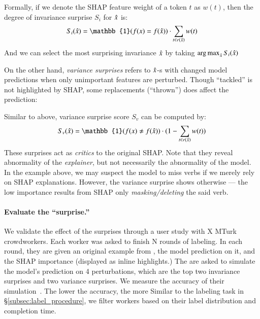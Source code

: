 Formally, if we denote the SHAP feature weight of a token $t$ as $w(t)$, then the degree of invariance surprise $S_i$ for $\hat{x}$ is: 
$$S_i(\xp) = \mathbb{1}(f(x) = f(\xp)) \cdot \sum_{t \in r(\xp)} w(t) $$
And we can select the most surprising invariance $\hat{x}$ by taking $\operatorname*{arg\,max}_{\hat{x}} S_i(\hat{x})$

On the other hand, \emph{variance surprises} refers to $\hat{x}$-s with changed model predictions when only unimportant features are perturbed.
Though ``tackled'' is not highlighted by SHAP, some replacements (\eg ``thrown'') does affect the prediction:


Similar to above, variance surprise score $S_v$ can be computed by:
$$S_v(\xp) = \mathbb{1}(f(x) \not\eq f(\xp)) \cdot (1-\sum_{t \in r(\xp)} w(t)) $$
These surprises act as \emph{critics} to the original SHAP.
Note that they reveal abnormality of the \emph{explainer}, but not necessarily the abnormality of the model.
In the example above, we may suspect the model to miss verbs if we merely rely on SHAP explanations. However, the variance surprise shows otherwise --- the low importance results from SHAP only \emph{masking/deleting} the said verb.



\paragraph{Evaluate the ``surprise.''}
We validate the effect of the surprises through a user study with X MTurk crowdworkers.
Each worker was asked to finish N rounds of labeling.
In each round, they are given an original example from \dnli, the model prediction on it, and the SHAP importance (displayed as inline highlights.)
The are asked to simulate the model's prediction on 4 perturbations, which are the top two invariance surprises and two variance surprises.
We measure the accuracy of their simulation~\cite{hase2020evaluating}. 
The lower the accuracy, the more 
Similar to the labeling task in \S\ref{subsec:label_procedure}, we filter workers based on their label distribution and completion time.



